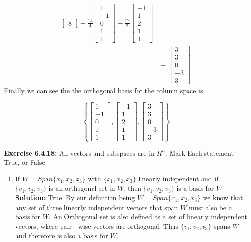 \documentclass{amsart}
\begin{document}
\begin{enumerate}
\begin{align*}
\begin{bmatrix}
8
\end{bmatrix} -
\frac{14}{4}
\begin{bmatrix}
1\\
-1\\
0\\
1\\
1
\end{bmatrix} - 
\frac{12}{2}
\begin{bmatrix}
-1\\
1\\
2\\
1\\
1
\end{bmatrix}\\
&=
\begin{bmatrix}
3\\
3\\
0\\
-3\\
3
\end{bmatrix}
\end{align*}
Finally we can see the the orthogonal basis for the column space is,

\begin{equation*}
\left\{
\begin{bmatrix}
1\\
-1\\
0\\
1\\
1
\end{bmatrix}
,
\begin{bmatrix}
-1\\
1\\
2\\
1\\
1
\end{bmatrix}
,
\begin{bmatrix}
3\\
3\\
0\\
-3\\
3
\end{bmatrix}
\right\}
\end{equation*}
\vspace{1in}

\noindent\textbf{Exercise 6.4.18: } All vectors and subspaces are in $R^n$. Mark Each statement True, or False\\

\begin{enumerate}

\item If $W = Span\{x_1,x_2,x_3\}$ with $\{x_1,x_2,x_3\}$ linearly independent and if $\{v_1,v_2,v_3\}$ is an orthogonal set in $W$, then $\{v_1,v_2,v_3\}$ is a basis for $W$\\
\textbf{Solution: }True. By our definition being $W = Span\{x_1,x_2,x_3\}$ we know that any set of three linearly independent vectors that span $W$ must also be a basis for $W$. An Orthogonal set is also defined as a set of linearly independent vectors, where pair - wise vectors are orthogonal. Thus $\{v_1,v_2,v_3\}$ spans $W$ and therefore is also a basis for $W$.
\vspace{1in}


\end{enumerate}
\end{enumerate}
\end{document}
